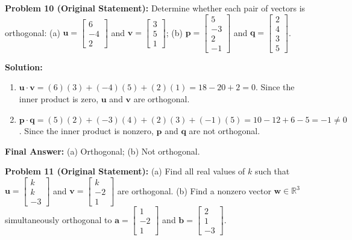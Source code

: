 \documentclass[11pt, letterpaper]{article}
\theoremstyle{definition}
\theoremstyle{remark}
\begin{document}
\medskip
\textbf{Problem 10 (Original Statement):} Determine whether each pair of vectors is orthogonal: (a) $\mathbf{u} = \begin{bmatrix} 6 \\ -4 \\ 2 \end{bmatrix}$ and $\mathbf{v} = \begin{bmatrix} 3 \\ 5 \\ 1 \end{bmatrix}$; (b) $\mathbf{p} = \begin{bmatrix} 5 \\ -3 \\ 2 \\ -1 \end{bmatrix}$ and $\mathbf{q} = \begin{bmatrix} 2 \\ 4 \\ 3 \\ 5 \end{bmatrix}$.

\textbf{Solution:}
\begin{enumerate}[label=(\alph*)]
    \item $\mathbf{u} \cdot \mathbf{v} = (6)(3) + (-4)(5) + (2)(1) = 18 - 20 + 2 = 0$. Since the inner product is zero, $\mathbf{u}$ and $\mathbf{v}$ are orthogonal.
    \item $\mathbf{p} \cdot \mathbf{q} = (5)(2) + (-3)(4) + (2)(3) + (-1)(5) = 10 - 12 + 6 - 5 = -1 \neq 0$. Since the inner product is nonzero, $\mathbf{p}$ and $\mathbf{q}$ are not orthogonal.
\end{enumerate}
\textbf{Final Answer:} (a) Orthogonal; (b) Not orthogonal.

\medskip
\textbf{Problem 11 (Original Statement):} (a) Find all real values of $k$ such that $\mathbf{u} = \begin{bmatrix} k \\ k \\ -3 \end{bmatrix}$ and $\mathbf{v} = \begin{bmatrix} k \\ -2 \\ 1 \end{bmatrix}$ are orthogonal. (b) Find a nonzero vector $\mathbf{w} \in \mathbb{R}^3$ simultaneously orthogonal to $\mathbf{a} = \begin{bmatrix} 1 \\ -2 \\ 1 \end{bmatrix}$ and $\mathbf{b} = \begin{bmatrix} 2 \\ 1 \\ -3 \end{bmatrix}$.
\end{document}
